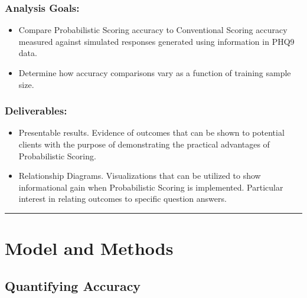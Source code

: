 \documentclass[12pt,]{article}
\providecommand{\tightlist}{%
  \setlength{\itemsep}{0pt}\setlength{\parskip}{0pt}}
\begin{document}
\hypertarget{analysis-goals}{%
\subsubsection{Analysis Goals:}\label{analysis-goals}}

\begin{itemize}
\tightlist
\item
  Compare Probabilistic Scoring accuracy to Conventional Scoring
  accuracy measured against simulated responses generated using
  information in PHQ9 data.
\item
  Determine how accuracy comparisons vary as a function of training
  sample size.
\end{itemize}

\hypertarget{deliverables}{%
\subsubsection{Deliverables:}\label{deliverables}}

\begin{itemize}
\tightlist
\item
  Presentable results. Evidence of outcomes that can be shown to
  potential clients with the purpose of demonstrating the practical
  advantages of Probabilistic Scoring.
\item
  Relationship Diagrams. Visualizations that can be utilized to show
  informational gain when Probabilistic Scoring is implemented.
  Particular interest in relating outcomes to specific question answers.
\end{itemize}

\begin{center}\rule{0.5\linewidth}{\linethickness}\end{center}

\hypertarget{model-and-methods}{%
\section{Model and Methods}\label{model-and-methods}}

\hypertarget{quantifying-accuracy}{%
\subsection{Quantifying Accuracy}\label{quantifying-accuracy}}
\end{document}
